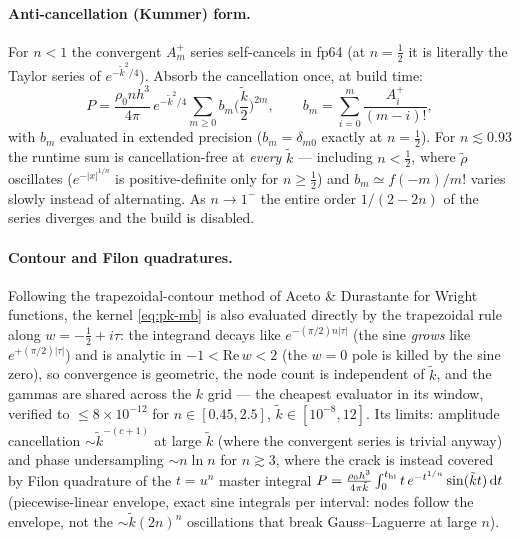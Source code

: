 \documentclass{article}
\begin{document}
\paragraph{Anti-cancellation (Kummer) form.} For $n<1$ the convergent
$A_m^+$ series self-cancels in fp64 (at $n=\tfrac12$ it is literally the
Taylor series of $e^{-\tilde k^2/4}$). Absorb the cancellation once, at
build time:
\begin{equation}\label{eq:pk-kummer}
P = \frac{\rho_0 n h^3}{4\pi}\,e^{-\tilde k^2/4}
\sum_{m\ge0} b_m\Big(\frac{\tilde k}{2}\Big)^{2m},
\qquad
b_m = \sum_{i=0}^{m}\frac{A_i^+}{(m-i)!},
\end{equation}
with $b_m$ evaluated in extended precision ($b_m = \delta_{m0}$ exactly at
$n=\tfrac12$). For $n\lesssim0.93$ the runtime sum is cancellation-free at
\emph{every} $\tilde k$ --- including $n<\tfrac12$, where $\tilde\rho$
oscillates ($e^{-|x|^{1/n}}$ is positive-definite only for $n\ge\tfrac12$)
and $b_m\simeq f(-m)/m!$ varies slowly instead of alternating. As
$n\to1^-$ the entire order $1/(2-2n)$ of the series diverges and the build
is disabled.

\paragraph{Contour and Filon quadratures.} Following the
trapezoidal-contour method of Aceto \& Durastante \cite{AcetoDurastante22}
for Wright functions, the kernel \eqref{eq:pk-mb} is also evaluated
directly by the trapezoidal rule along $w=-\tfrac12+i\tau$: the integrand
decays like $e^{-(\pi/2)n|\tau|}$ (the sine \emph{grows} like
$e^{+(\pi/2)|\tau|}$) and is analytic in $-1<\mathrm{Re}\,w<2$ (the $w=0$
pole is killed by the sine zero), so convergence is geometric, the node
count is independent of $\tilde k$, and the gammas are shared across the
$k$ grid --- the cheapest evaluator in its window, verified to
$\le8\times10^{-12}$ for $n\in[0.45,2.5]$, $\tilde k\in[10^{-8},12]$. Its
limits: amplitude cancellation $\sim\tilde k^{-(c+1)}$ at large $\tilde k$
(where the convergent series is trivial anyway) and phase undersampling
$\sim n\ln n$ for $n\gtrsim3$, where the crack is instead covered by Filon
quadrature of the $t=u^n$ master integral
$P = \frac{\rho_0h^3}{4\pi\tilde k}\int_0^{t_{\rm hi}} t\,e^{-t^{1/n}}
\sin(\tilde k t)\,{\rm d}t$ (piecewise-linear envelope, exact sine
integrals per interval: nodes follow the envelope, not the
$\sim\tilde k(2n)^n$ oscillations that break Gauss--Laguerre at large
$n$).
\end{document}
